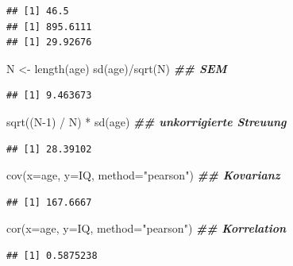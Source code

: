 \documentclass[
]{book}
\newenvironment{Shaded}{\begin{snugshade}}{\end{snugshade}}
\newcommand{\AttributeTok}[1]{\textcolor[rgb]{0.77,0.63,0.00}{#1}}
\newcommand{\DecValTok}[1]{\textcolor[rgb]{0.00,0.00,0.81}{#1}}
\newcommand{\DocumentationTok}[1]{\textcolor[rgb]{0.56,0.35,0.01}{\textbf{\textit{#1}}}}
\newcommand{\FunctionTok}[1]{\textcolor[rgb]{0.00,0.00,0.00}{#1}}
\newcommand{\NormalTok}[1]{#1}
\newcommand{\OtherTok}[1]{\textcolor[rgb]{0.56,0.35,0.01}{#1}}
\newcommand{\SpecialCharTok}[1]{\textcolor[rgb]{0.00,0.00,0.00}{#1}}
\newcommand{\StringTok}[1]{\textcolor[rgb]{0.31,0.60,0.02}{#1}}
\begin{document}
\begin{verbatim}
## [1] 46.5
## [1] 895.6111
## [1] 29.92676
\end{verbatim}

\begin{Shaded}
\begin{Highlighting}[]
\NormalTok{N }\OtherTok{\textless{}{-}} \FunctionTok{length}\NormalTok{(age)}
\FunctionTok{sd}\NormalTok{(age)}\SpecialCharTok{/}\FunctionTok{sqrt}\NormalTok{(N) }\DocumentationTok{\#\# SEM}
\end{Highlighting}
\end{Shaded}

\begin{verbatim}
## [1] 9.463673
\end{verbatim}

\begin{Shaded}
\begin{Highlighting}[]
\FunctionTok{sqrt}\NormalTok{((N}\DecValTok{{-}1}\NormalTok{) }\SpecialCharTok{/}\NormalTok{ N) }\SpecialCharTok{*} \FunctionTok{sd}\NormalTok{(age) }\DocumentationTok{\#\# unkorrigierte Streuung}
\end{Highlighting}
\end{Shaded}

\begin{verbatim}
## [1] 28.39102
\end{verbatim}

\begin{Shaded}
\begin{Highlighting}[]
\FunctionTok{cov}\NormalTok{(}\AttributeTok{x=}\NormalTok{age, }\AttributeTok{y=}\NormalTok{IQ, }\AttributeTok{method=}\StringTok{"pearson"}\NormalTok{)  }\DocumentationTok{\#\# Kovarianz}
\end{Highlighting}
\end{Shaded}

\begin{verbatim}
## [1] 167.6667
\end{verbatim}

\begin{Shaded}
\begin{Highlighting}[]
\FunctionTok{cor}\NormalTok{(}\AttributeTok{x=}\NormalTok{age, }\AttributeTok{y=}\NormalTok{IQ, }\AttributeTok{method=}\StringTok{"pearson"}\NormalTok{)  }\DocumentationTok{\#\# Korrelation}
\end{Highlighting}
\end{Shaded}

\begin{verbatim}
## [1] 0.5875238
\end{verbatim}
\end{document}
